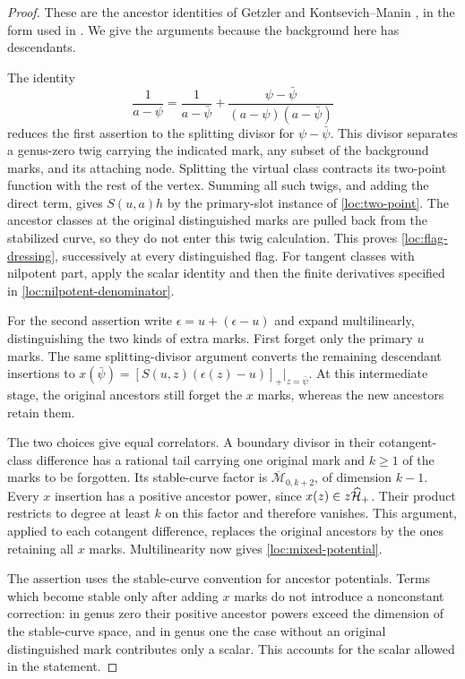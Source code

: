 \begin{proof}
These are the ancestor identities of Getzler and
Kontsevich--Manin \cite{Getzler,KontsevichManin}, in the form used in
\cite[\S3.5, Proposition~3.6]{CGT}. We give the arguments because the
background here has descendants.

The identity
\[
 \frac1{a-\psi}=\frac1{a-\bar\psi}
       +\frac{\psi-\bar\psi}{(a-\psi)(a-\bar\psi)}
\]
reduces the first assertion to the splitting divisor for
$\psi-\bar\psi$. This divisor separates a genus-zero twig carrying
the indicated mark, any subset of the background marks, and its
attaching node. Splitting the virtual class contracts its two-point
function with the rest of the vertex. Summing all such twigs, and
adding the direct term, gives $S(u,a)h$ by the primary-slot instance
of \eqref{loc:two-point}. The ancestor classes at the original
distinguished marks are pulled back from the stabilized curve, so
they do not enter this twig calculation. This proves
\eqref{loc:flag-dressing}, successively at every distinguished flag.
For tangent classes with nilpotent part, apply the scalar identity
and then the finite derivatives specified in
\eqref{loc:nilpotent-denominator}.

For the second assertion write $\epsilon=u+(\epsilon-u)$ and expand
multilinearly, distinguishing the two kinds of extra marks. First
forget only the primary $u$ marks. The same splitting-divisor
argument converts the remaining descendant insertions to
$x(\bar\psi)=[S(u,z)(\epsilon(z)-u)]_+|_{z=\bar\psi}$.
At this intermediate stage, the original ancestors still forget
the $x$ marks, whereas the new ancestors retain them.

The two choices give equal correlators. A boundary divisor in their
cotangent-class difference has a rational tail carrying one original
mark and $k\geq1$ of the marks to be forgotten. Its stable-curve
factor is $\overline{\mathcal M}_{0,k+2}$, of dimension $k-1$.
Every $x$ insertion has a positive ancestor power, since
$x(z)\in z\widehat{\mathcal H}_+$. Their product restricts to degree at least $k$
on this factor and therefore vanishes. This argument, applied to
each cotangent difference, replaces the original ancestors by the
ones retaining all $x$ marks. Multilinearity now gives
\eqref{loc:mixed-potential}.

The assertion uses the stable-curve convention for ancestor
potentials. Terms which become stable only after adding $x$ marks
do not introduce a nonconstant correction: in genus zero their
positive ancestor powers exceed the dimension of the stable-curve
space, and in genus one the case without an original distinguished
mark contributes only a scalar. This accounts for the scalar allowed
in the statement.
\end{proof}

